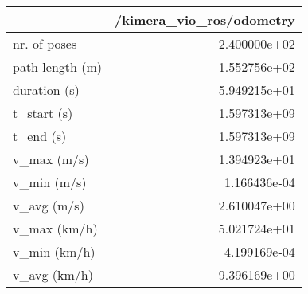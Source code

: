 \begin{tabular}{lr}
\toprule
{} &  /kimera\_vio\_ros/odometry \\
\midrule
nr. of poses    &              2.400000e+02 \\
path length (m) &              1.552756e+02 \\
duration (s)    &              5.949215e+01 \\
t\_start (s)     &              1.597313e+09 \\
t\_end (s)       &              1.597313e+09 \\
v\_max (m/s)     &              1.394923e+01 \\
v\_min (m/s)     &              1.166436e-04 \\
v\_avg (m/s)     &              2.610047e+00 \\
v\_max (km/h)    &              5.021724e+01 \\
v\_min (km/h)    &              4.199169e-04 \\
v\_avg (km/h)    &              9.396169e+00 \\
\bottomrule
\end{tabular}
